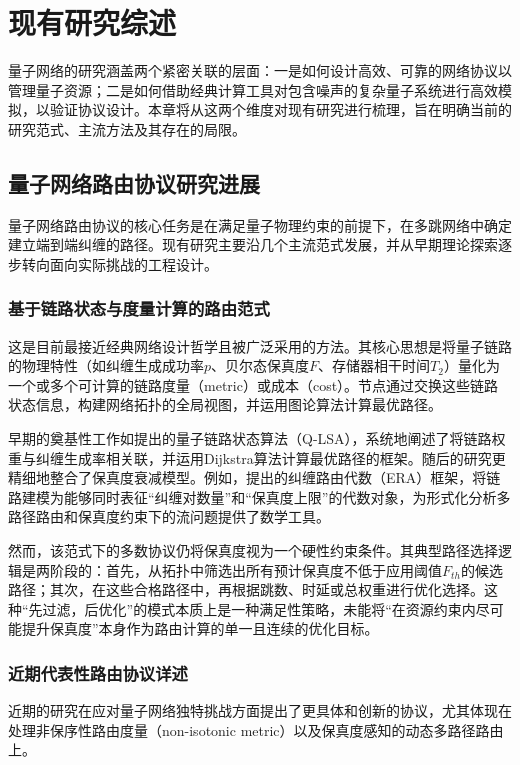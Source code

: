 
\chapter{现有研究综述}

量子网络的研究涵盖两个紧密关联的层面：一是如何设计高效、可靠的网络协议以管理量子资源；二是如何借助经典计算工具对包含噪声的复杂量子系统进行高效模拟，以验证协议设计。本章将从这两个维度对现有研究进行梳理，旨在明确当前的研究范式、主流方法及其存在的局限。

\section{量子网络路由协议研究进展}
量子网络路由协议的核心任务是在满足量子物理约束的前提下，在多跳网络中确定建立端到端纠缠的路径。现有研究主要沿几个主流范式发展，并从早期理论探索逐步转向面向实际挑战的工程设计。

\subsection{基于链路状态与度量计算的路由范式}
这是目前最接近经典网络设计哲学且被广泛采用的方法。其核心思想是将量子链路的物理特性（如纠缠生成成功率$p$、贝尔态保真度$F$、存储器相干时间$T_2$）量化为一个或多个可计算的链路度量（metric）或成本（cost）。节点通过交换这些链路状态信息，构建网络拓扑的全局视图，并运用图论算法计算最优路径。

早期的奠基性工作如\cite{Ali2017Optimal}提出的量子链路状态算法（Q-LSA），系统地阐述了将链路权重与纠缠生成率相关联，并运用Dijkstra算法计算最优路径的框架。随后的研究更精细地整合了保真度衰减模型。例如，\cite{Caleffi2017Routing}提出的纠缠路由代数（ERA）框架，将链路建模为能够同时表征“纠缠对数量”和“保真度上限”的代数对象，为形式化分析多路径路由和保真度约束下的流问题提供了数学工具。

然而，该范式下的多数协议仍将保真度视为一个硬性约束条件。其典型路径选择逻辑是两阶段的：首先，从拓扑中筛选出所有预计保真度不低于应用阈值$F_{th}$的候选路径；其次，在这些合格路径中，再根据跳数、时延或总权重进行优化选择。这种“先过滤，后优化”的模式本质上是一种满足性策略，未能将“在资源约束内尽可能提升保真度”本身作为路由计算的单一且连续的优化目标。

\subsection{近期代表性路由协议详述}
近期的研究在应对量子网络独特挑战方面提出了更具体和创新的协议，尤其体现在处理非保序性路由度量（non-isotonic metric）以及保真度感知的动态多路径路由上。

